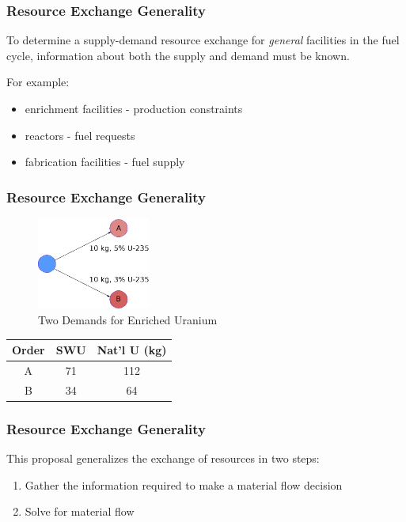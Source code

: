 
\begin{frame}[ctb!]
  \frametitle{Resource Exchange Generality}

  To determine a supply-demand resource exchange for \textit{general} facilities
  in the fuel cycle, information about both the supply and demand must be known.

  \vspace{0.2cm}
  
  For example:
  \begin{itemize}
    \item enrichment facilities - production constraints
    \item reactors - fuel requests
    \item fabrication facilities - fuel supply
  \end{itemize}
  
\end{frame}

\begin{frame}[ctb!]
  \frametitle{Resource Exchange Generality}

  \begin{figure}
    \includegraphics[height=3cm]{./images/enr.eps}
    \caption{Two Demands for Enriched Uranium}
  \end{figure}
  
  \begin{table} [h!]
    \begin{tabular}{|c|c|c|}
      \hline  
      Order & SWU & Nat'l U (kg) \\
      \hline  
      A & 71 & 112\\
      B & 34 & 64\\
      \hline  
    \end{tabular}
  \end{table}

\end{frame}

\begin{frame}[ctb!]
  \frametitle{Resource Exchange Generality}

  This proposal generalizes the exchange of resources in two steps:

  \begin{enumerate}
    \item Gather the information required to make a material flow decision
    \item Solve for material flow
  \end{enumerate}
\end{frame}

